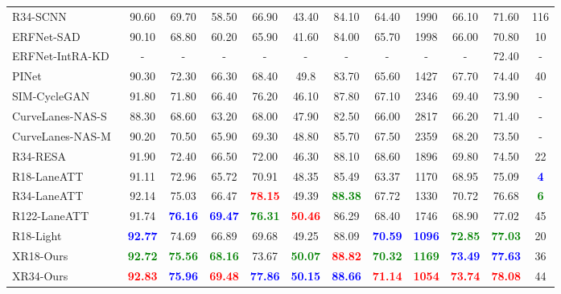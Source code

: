 \documentclass[preprint,12pt,review]{elsarticle}
\begin{document}
\begin{table*}[htbp]
{\begin{tabular}{l||ccccccccc|c|c}
			R34-SCNN~\cite{SCNN} &90.60 &69.70 &58.50 &66.90 &43.40 &84.10 &64.40 &1990 &66.10 &71.60 &116\\
			ERFNet-SAD~\cite{distillation} &90.10 &68.80 &60.20 &65.90 &41.60 &84.00 &65.70 &1998 &66.00 &70.80 &10\\ 
			ERFNet-IntRA-KD &- &- &- &- &- &- &- &- &- &72.40 &-\\
			PINet~\cite{PINet} &90.30 &72.30 &66.30 &68.40 &49.8 &83.70 &65.60 &1427 &67.70 &74.40 &40\\
			SIM-CycleGAN\cite{liulane} &91.80 &71.80 &66.40 &76.20 &46.10 &87.80 &67.10 &2346 &69.40 &73.90 &-\\
			CurveLanes-NAS-S~\cite{curvelane} &88.30 &68.60 &63.20 &68.00 &47.90 &82.50 &66.00 &2817 &66.20 &71.40 &-\\
			CurveLanes-NAS-M~\cite{curvelane} &90.20 &70.50 &65.90 &69.30 &48.80 &85.70 &67.50 &2359 &68.20 &73.50&-\\
		    R34-RESA~\cite{resa} &91.90 &72.40  &66.50 &72.00 &46.30 &88.10 &68.60 &1896 &69.80 &74.50 &22 \\
			R18-LaneATT~\cite{laneatt} &91.11 &72.96 &65.72 &70.91 &48.35 &85.49 &63.37 &1170 &68.95 &75.09 &\textcolor{blue}{\bf{4}}\\
			R34-LaneATT~\cite{laneatt} &92.14 &75.03 &66.47 &\textcolor{red}{\bf{78.15}} &49.39 &\textcolor{green}{\bf{88.38}} &67.72 &1330 &70.72 &76.68 &\textcolor{green}{\bf{6}}\\
			R122-LaneATT~\cite{laneatt} &91.74 &\textcolor{blue}{\bf{76.16}} &\textcolor{blue}{\bf{69.47}} &\textcolor{green}{\bf{76.31}} &\textcolor{red}{\bf{50.46}} &86.29 &68.40 &1746 &68.90 &77.02 &45\\
			\hline\hline
			R18-Light &\textcolor{blue}{\bf{92.77}} &74.69 &66.89 &69.68 &49.25 &88.09 &\textcolor{blue}{\bf{70.59}} &\textcolor{blue}{\bf{1096}} &\textcolor{green}{\bf{72.85}} &\textcolor{green}{\bf{77.03}} &20\\
			
			XR18-Ours &\textcolor{green}{\bf{92.72}} &\textcolor{green}{\bf{75.56}} &\textcolor{green}{\bf{68.16}} &73.67 &\textcolor{green}{\bf{50.07}} &\textcolor{red}{\bf{88.82}} &\textcolor{green}{\bf{70.32}} &\textcolor{green}{\bf{1169}} &\textcolor{blue}{\bf{73.49}} &\textcolor{blue}{\bf{77.63}} &36\\
			
			XR34-Ours &\textcolor{red}{\bf{92.83}} &\textcolor{blue}{\bf{75.96}} &\textcolor{red}{\bf{69.48}} &\textcolor{blue}{\bf{77.86}} &\textcolor{blue}{\bf{50.15}} &\textcolor{blue}{\bf{88.66}} &\textcolor{red}{\bf{71.14}} &\textcolor{red}{\bf{1054}} &\textcolor{red}{\bf{73.74}} &\textcolor{red}{\bf{78.08}} &44\\
			\bottomrule[1pt]  
		\end{tabular}
	}
	\label{table:culane}
\end{table*}
\end{document}

